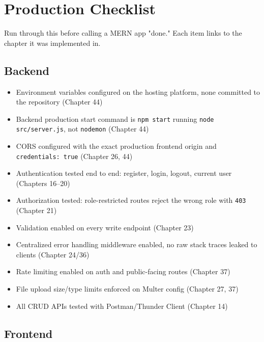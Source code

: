 \chapter{Production Checklist}

\begin{notebox}[NOTE]
Run through this before calling a MERN app "done." Each item links to the chapter it was implemented in.
\end{notebox}

\section{Backend}

\begin{itemize}
\item[$\square$] Environment variables configured on the hosting
platform, none committed to the repository (Chapter 44)
\item[$\square$] Backend production start command is \texttt{npm start}
running \texttt{node src/server.js}, not \texttt{nodemon} (Chapter 44)
\item[$\square$] CORS configured with the exact production frontend
origin and \texttt{credentials: true} (Chapter 26, 44)
\item[$\square$] Authentication tested end to end: register, login,
logout, current user (Chapters 16--20)
\item[$\square$] Authorization tested: role-restricted routes reject the
wrong role with \texttt{403} (Chapter 21)
\item[$\square$] Validation enabled on every write endpoint (Chapter 23)
\item[$\square$] Centralized error handling middleware enabled, no raw
stack traces leaked to clients (Chapter 24/36)
\item[$\square$] Rate limiting enabled on auth and public-facing routes
(Chapter 37)
\item[$\square$] File upload size/type limits enforced on Multer config
(Chapter 27, 37)
\item[$\square$] All CRUD APIs tested with Postman/Thunder Client
(Chapter 14)
\end{itemize}

\section{Frontend}

